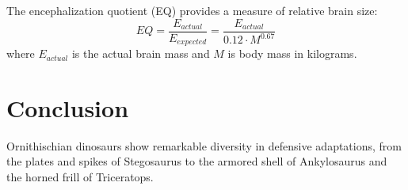 \documentclass[12pt]{article}
\begin{document}
The encephalization quotient (EQ) provides a measure of relative brain size:
\begin{equation}
EQ = \frac{E_{actual}}{E_{expected}} = \frac{E_{actual}}{0.12 \cdot M^{0.67}}
\end{equation}
where $E_{actual}$ is the actual brain mass and $M$ is body mass in kilograms.

\section{Conclusion}

Ornithischian dinosaurs show remarkable diversity in defensive adaptations,
from the plates and spikes of Stegosaurus to the armored shell of Ankylosaurus
and the horned frill of Triceratops.
\end{document}
